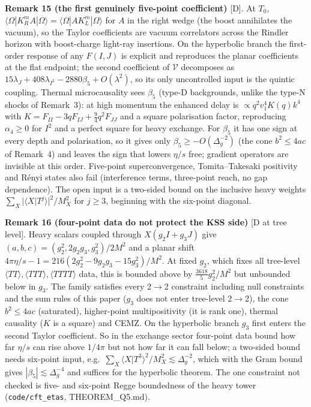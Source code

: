 \textbf{Remark 15 (the first genuinely five-point coefficient)} [D]. At $T_0$, $\langle\Omega|K_R^mA|\Omega\rangle=\langle\Omega|AK_L^m|\Omega\rangle$ for $A$ in the
right wedge (the boost annihilates the vacuum), so the Taylor coefficients are vacuum correlators across the Rindler horizon with boost-charge light-ray
insertions. On the hyperbolic branch the first-order response of any $F(I,J)$ is explicit and reproduces the planar coefficients at the flat endpoint;
the second coefficient of $\mathcal V$ decomposes as $15\lambda_J+408\lambda_{I^2}-2880\beta_5+O(\lambda^2)$, so its only uncontrolled input is the quintic
coupling. Thermal microcausality sees $\beta_5$ (type-D backgrounds, unlike the type-N shocks of Remark~3): at high momentum the enhanced delay is
$\propto q^2v_1^4K(q)k^4$ with $K=F_{II}-3qF_{IJ}+\tfrac94q^2F_{JJ}$ and a square polarisation factor, reproducing $\alpha_4\ge0$ for $I^2$ and a perfect
square for heavy exchange. For $\beta_5$ it has one sign at every depth and polarisation, so it gives only $\beta_5\ge-O(\Delta_g^{-2})$ (the cone
$b^2\le4ac$ of Remark~4) and leaves the sign that lowers $\eta/s$ free; gradient operators are invisible at this order. Five-point superconvergence,
Tomita--Takesaki positivity and Rényi states also fail (interference terms, three-point reach, no gap dependence). The open input is a two-sided bound
on the inclusive heavy weights $\sum_X|\langle X|T^j\rangle|^2/M_X^2$ for $j\ge3$, beginning with the six-point diagonal.

\textbf{Remark 16 (four-point data do not protect the KSS side)} [D at tree level]. Heavy scalars coupled through $X(g_2I+g_3J)$ give
$(a,b,c)=(g_2^2,2g_2g_3,g_3^2)/2M^2$ and a planar shift $4\pi\eta/s-1=216(2g_2^2-9g_2g_3-15g_3^2)/M^2$. At fixed $g_2$, which fixes all tree-level
$\langle TT\rangle,\langle TTT\rangle,\langle TTTT\rangle$ data, this is bounded above by $\tfrac{3618}5g_2^2/M^2$ but unbounded below in $g_3$. The family
satisfies every 2$\to$2 constraint including null constraints and the sum rules of this paper ($g_3$ does not enter tree-level 2$\to$2), the cone
$b^2\le4ac$ (saturated), higher-point multipositivity (it is rank one), thermal causality ($K$ is a square) and CEMZ. On the hyperbolic branch $g_3$
first enters the second Taylor coefficient. So in the exchange sector four-point data bound how far $\eta/s$ can rise above $1/4\pi$ but not how
far it can fall below; a two-sided bound needs six-point input, e.g.\ $\sum_X\langle X|T^3\rangle^2/M_X^2\lesssim\Delta_g^{-2}$, which with the Gram bound
gives $|\beta_5|\lesssim\Delta_g^{-4}$ and suffices for the hyperbolic theorem. The one constraint not checked is five- and six-point Regge boundedness of
the heavy tower (\texttt{code/cft\_etas}, THEOREM\_Q5.md).


